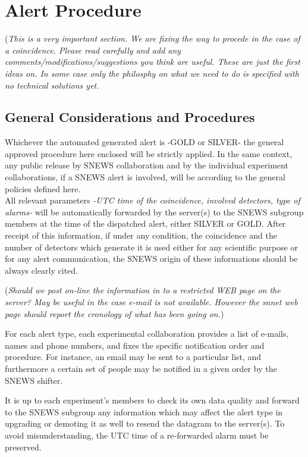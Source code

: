 \documentclass{article}
\begin{document}
\section{Alert Procedure}
({\it This is a very important section. We are fixing the way to procede
in the case of a coincidence. Please read carefully and add any 
comments/modifications/suggestions you think are useful. These are 
just the first ideas on. In some case  only the philosphy on what we need 
to do is specified with no technical solutions yet.}\\

\subsection{General Considerations and Procedures}

Whichever the automated generated alert is -GOLD or SILVER- the
general approved procedure here enclosed will be strictly applied. In
the same context, any public release by SNEWS collaboration and by the
individual experiment collaborations, if a SNEWS alert is involved,
will be according to the general policies defined here.\\


All relevant parameters {\it -UTC
time of the coincidence, involved detectors, type of alarms-} will be
automatically forwarded by the server(s) to the SNEWS subgroup members
at the time of the dispatched alert, either SILVER or GOLD.
After receipt of this information, if under any condition,
the coincidence and the number of detectors which generate 
it is used either for any scientific purpose or for any alert
communication, the SNEWS origin of these informations
should be always clearly cited.

({\it Should we post on-line the information in to a 
restricted WEB page on the server? May be useful in the case e-mail is not available. 
However the snnet web page should report the cronology of what has been going on.})

For each alert type, each experimental collaboration 
provides a list of e-mails, names and phone numbers, and fixes
the specific
notification order and procedure. For instance, an email may
be sent to a particular list, and furthermore a certain set of
people may be notified in a given order by the SNEWS shifter.

It is up to each experiment's members to check
its own data quality and forward to the SNEWS subgroup any information
which may affect the alert type in upgrading or demoting it as well to
resend the datagram to the server(s).  To avoid misunderstanding, the
UTC time of a re-forwarded alarm must be preserved.
 
\end{document}
